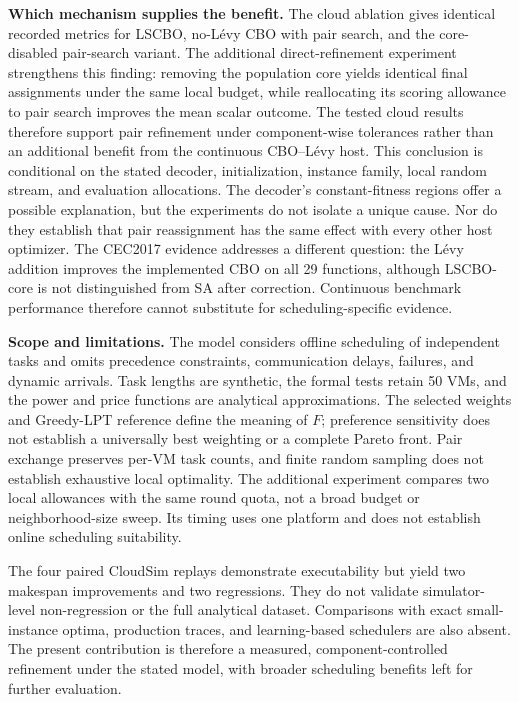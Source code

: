 \documentclass[pdflatex,onecolumn,sn-mathphys-num]{sn-jnl}
\begin{document}
\textbf{Which mechanism supplies the benefit.}
The cloud ablation gives identical recorded metrics for LSCBO, no-L\'{e}vy CBO with pair search, and the core-disabled pair-search variant. The additional direct-refinement experiment strengthens this finding: removing the population core yields identical final assignments under the same local budget, while reallocating its scoring allowance to pair search improves the mean scalar outcome. The tested cloud results therefore support pair refinement under component-wise tolerances rather than an additional benefit from the continuous CBO--L\'{e}vy host. This conclusion is conditional on the stated decoder, initialization, instance family, local random stream, and evaluation allocations. The decoder's constant-fitness regions offer a possible explanation, but the experiments do not isolate a unique cause. Nor do they establish that pair reassignment has the same effect with every other host optimizer. The CEC2017 evidence addresses a different question: the L\'{e}vy addition improves the implemented CBO on all 29 functions, although LSCBO-core is not distinguished from SA after correction. Continuous benchmark performance therefore cannot substitute for scheduling-specific evidence.

\textbf{Scope and limitations.}
The model considers offline scheduling of independent tasks and omits precedence constraints, communication delays, failures, and dynamic arrivals. Task lengths are synthetic, the formal tests retain 50 VMs, and the power and price functions are analytical approximations. The selected weights and Greedy-LPT reference define the meaning of $F$; preference sensitivity does not establish a universally best weighting or a complete Pareto front. Pair exchange preserves per-VM task counts, and finite random sampling does not establish exhaustive local optimality. The additional experiment compares two local allowances with the same round quota, not a broad budget or neighborhood-size sweep. Its timing uses one platform and does not establish online scheduling suitability.

The four paired CloudSim replays demonstrate executability but yield two makespan improvements and two regressions. They do not validate simulator-level non-regression or the full analytical dataset. Comparisons with exact small-instance optima, production traces, and learning-based schedulers are also absent. The present contribution is therefore a measured, component-controlled refinement under the stated model, with broader scheduling benefits left for further evaluation.
\end{document}
